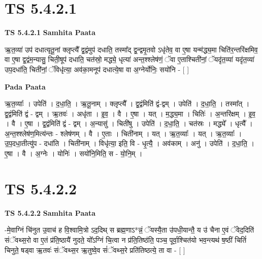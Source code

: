 \documentclass[17pt]{extarticle}
\begin{document}
\section*{ TS 5.4.2.1 }

\textbf{TS 5.4.2.1 } \newline
\textbf{Samhita Paata} \newline

ऋ॒त॒व्या॑ उप॑ दधात्यृतू॒नां क्लृप्त्यै᳚ द्व॒द्वंमुप॑ दधाति॒ तस्मा᳚द् द्व॒न्द्वमृ॒तवो ऽधृ॑तेव॒ वा ए॒षा यन्म॑द्ध्य॒मा चिति॑र॒न्तरि॑क्षमिव॒ वा ए॒षा द्व॒द्वंम॒न्यासु॒ चिती॒षूप॑ दधाति॒ चत॑स्रो॒ मद्ध्ये॒ धृत्या॑ अन्त॒श्श्लेष॑णं॒ ॅवा ए॒ताश्चिती॑नां॒ ॅयदृ॑त॒व्या॑ यदृ॑त॒व्या॑ उप॒दधा॑ति॒ चिती॑नां॒ ॅविधृ॑त्या॒ अव॑का॒मनूप॑ दधात्ये॒षा वा अ॒ग्नेर्योनिः॒ सयो॑नि - [  ] \newline

\textbf{Pada Paata} \newline

ऋ॒त॒व्याः᳚ । उपेति॑ । द॒धा॒ति॒ । ऋ॒तू॒नाम् । क्लृप्त्यै᳚ । द्व॒द्वंमिति॑ द्वं-द्वम् । उपेति॑ । द॒धा॒ति॒ । तस्मा᳚त् । द्व॒द्वंमिति॑ द्वं - द्वम् । ऋ॒तवः॑ । अधृ॑ता । इ॒व॒ । वै । ए॒षा । यत् । म॒द्ध्य॒मा । चितिः॑ । अ॒न्तरि॑क्षम् । इ॒व॒ । वै । ए॒षा । द्व॒द्वंमिति॑ द्वं - द्वम् । अ॒न्यासु॑ । चिती॑षु । उपेति॑ । द॒धा॒ति॒ । चत॑स्रः । मद्ध्ये᳚ । धृत्यै᳚ । अ॒न्त॒श्श्लेष॑ण॒मित्य॑न्तः - श्लेष॑णम् । वै । ए॒ताः । चिती॑नाम् । यत् । ऋ॒त॒व्याः᳚ । यत् । ऋ॒त॒व्याः᳚ । उ॒प॒दधा॒तीत्यु॑प - दधा॑ति । चिती॑नाम् । विधृ॑त्या॒ इति॒ वि - धृ॒त्यै॒ । अव॑काम् । अनु॑ । उपेति॑ । द॒धा॒ति॒ । ए॒षा । वै । अ॒ग्नेः । योनिः॑ । सयो॑नि॒मिति॒ स - यो॒नि॒म् ।  \newline




\section*{ TS 5.4.2.2 }

\textbf{TS 5.4.2.2 } \newline
\textbf{Samhita Paata} \newline

-मे॒वाग्निं चि॑नुत उ॒वाच॑ ह वि॒श्वामि॒त्रो ऽद॒दिथ् स ब्रह्म॒णाऽ*न्नं॒ ॅयस्यै॒ता उ॑पधी॒यान्तै॒ य उ॑ चैना ए॒वं ॅवेद॒दिति॑ संॅवथ्स॒रो वा ए॒तं प्र॑ति॒ष्ठायै॑ नुदते॒ यो᳚ऽग्निं चि॒त्वा न प्र॑ति॒तिष्ठ॑ति॒ पञ्च॒ पूर्वा॒श्चित॑यो भव॒न्त्यथ॑ ष॒ष्ठीं चितिं॑ चिनुते॒ षड्वा ऋ॒तवः॑ संॅवथ्स॒र ऋ॒तुष्वे॒व सं॑ॅवथ्स॒रे प्रति॑तिष्ठत्ये॒ ता वा - [  ] \newline
\end{document}
